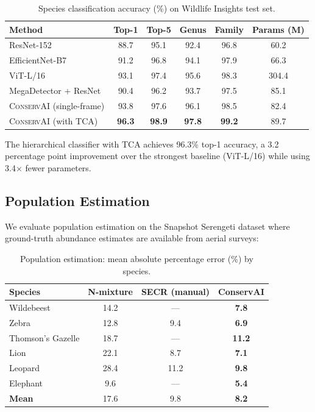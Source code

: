 \documentclass[11pt,letterpaper]{article}
\newcommand{\ConservAI}{\textsc{ConservAI}}
\begin{document}
\begin{table}[htbp]
\centering
\caption{Species classification accuracy (\%) on Wildlife Insights test set.}
\label{tab:classification}
\begin{tabular}{lccccc}
\toprule
\textbf{Method} & \textbf{Top-1} & \textbf{Top-5} & \textbf{Genus} & \textbf{Family} & \textbf{Params (M)} \\
\midrule
ResNet-152~\cite{norouzzadeh2018} & 88.7 & 95.1 & 92.4 & 96.8 & 60.2 \\
EfficientNet-B7~\cite{tan2019} & 91.2 & 96.8 & 94.1 & 97.9 & 66.3 \\
ViT-L/16~\cite{dosovitskiy2021} & 93.1 & 97.4 & 95.6 & 98.3 & 304.4 \\
MegaDetector + ResNet~\cite{beery2019mega} & 90.4 & 96.2 & 93.7 & 97.5 & 85.1 \\
\midrule
\ConservAI{} (single-frame) & 93.8 & 97.6 & 96.1 & 98.5 & 82.4 \\
\ConservAI{} (with TCA) & \textbf{96.3} & \textbf{98.9} & \textbf{97.8} & \textbf{99.2} & 89.7 \\
\bottomrule
\end{tabular}
\end{table}

The hierarchical classifier with TCA achieves 96.3\% top-1 accuracy, a 3.2 percentage point improvement over the strongest baseline (ViT-L/16) while using 3.4$\times$ fewer parameters.

\subsection{Population Estimation}

We evaluate population estimation on the Snapshot Serengeti dataset where ground-truth abundance estimates are available from aerial surveys:

\begin{table}[htbp]
\centering
\caption{Population estimation: mean absolute percentage error (\%) by species.}
\label{tab:population}
\begin{tabular}{lccc}
\toprule
\textbf{Species} & \textbf{N-mixture} & \textbf{SECR (manual)} & \textbf{ConservAI} \\
\midrule
Wildebeest & 14.2 & --- & \textbf{7.8} \\
Zebra & 12.8 & 9.4 & \textbf{6.9} \\
Thomson's Gazelle & 18.7 & --- & \textbf{11.2} \\
Lion & 22.1 & 8.7 & \textbf{7.1} \\
Leopard & 28.4 & 11.2 & \textbf{9.8} \\
Elephant & 9.6 & --- & \textbf{5.4} \\
\midrule
\textbf{Mean} & 17.6 & 9.8 & \textbf{8.2} \\
\bottomrule
\end{tabular}
\end{table}
\end{document}
